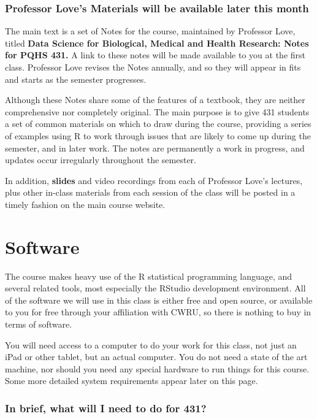 \documentclass[
]{book}
\begin{document}
\hypertarget{professor-loves-materials-will-be-available-later-this-month}{%
\subsection{Professor Love's Materials will be available later this month}\label{professor-loves-materials-will-be-available-later-this-month}}

The main text is a set of Notes for the course, maintained by Professor Love, titled \textbf{Data Science for Biological, Medical and Health Research: Notes for PQHS 431.} A link to these notes will be made available to you at the first class. Professor Love revises the Notes annually, and so they will appear in fits and starts as the semester progresses.

Although these Notes share some of the features of a textbook, they are neither comprehensive nor completely original. The main purpose is to give 431 students a set of common materials on which to draw during the course, providing a series of examples using R to work through issues that are likely to come up during the semester, and in later work. The notes are permanently a work in progress, and updates occur irregularly throughout the semester.

In addition, \textbf{slides} and video recordings from each of Professor Love's lectures, plus other in-class materials from each session of the class will be posted in a timely fashion on the main course website.

\hypertarget{software}{%
\chapter{Software}\label{software}}

The course makes heavy use of the R statistical programming language, and several related tools, most especially the RStudio development environment. All of the software we will use in this class is either free and open source, or available to you for free through your affiliation with CWRU, so there is nothing to buy in terms of software.

You will need access to a computer to do your work for this class, not just an iPad or other tablet, but an actual computer. You do not need a state of the art machine, nor should you need any special hardware to run things for this course. Some more detailed system requirements appear later on this page.

\hypertarget{in-brief-what-will-i-need-to-do-for-431}{%
\subsection{In brief, what will I need to do for 431?}\label{in-brief-what-will-i-need-to-do-for-431}}
\end{document}
